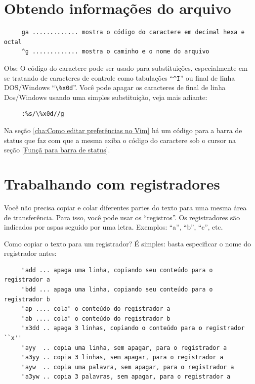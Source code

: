 \documentclass[10pt,a4paper,openany]{book}
\begin{document}
\section{Obtendo informações do arquivo}

\begin{verbatim}
     ga ............. mostra o código do caractere em decimal hexa e octal
     ^g ............. mostra o caminho e o nome do arquivo
\end{verbatim}

Obs: O código do caractere pode ser usado para substituições,
especialmente em se tratando de caracteres de controle como tabulações
``\verb|^I|'' ou final de linha DOS/Windows ``\verb|\%x0d|''. Você pode apagar os
caracteres de final de linha Dos/Windows usando uma simples
substituição, veja mais adiante:

\begin{verbatim}
     :%s/\%x0d//g
\end{verbatim}

Na seção \ref{cha:Como editar preferências no Vim} há um código para a barra de
status que faz com que a mesma exiba o código do caractere sob o cursor na
seção \ref{Funçã para barra de status}.

\section{Trabalhando com registradores}
\label{Trabalhando com registradores}

Você não precisa copiar e colar diferentes partes do texto para uma
mesma área de transferência.  Para isso, você pode usar os
``registros''.  Os registradores são indicados por aspas seguido por uma letra.
Exemplos: ``a'', ``b'', ``c'', etc.

Como copiar o texto para um registrador? É simples: basta especificar
o nome do registrador antes:

\begin{verbatim}
     "add ... apaga uma linha, copiando seu conteúdo para o registrador a
     "bdd ... apaga uma linha, copiando seu conteúdo para o registrador b
     "ap .... cola" o conteúdo do registrador a
     "ab .... cola" o conteúdo do registrador b
     "x3dd .. apaga 3 linhas, copiando o conteúdo para o registrador ``x''
     "ayy  .. copia uma linha, sem apagar, para o registrador a
     "a3yy .. copia 3 linhas, sem apagar, para o registrador a
     "ayw  .. copia uma palavra, sem apagar, para o registrador a
     "a3yw .. copia 3 palavras, sem apagar, para o registrador a
\end{verbatim}
\end{document}
